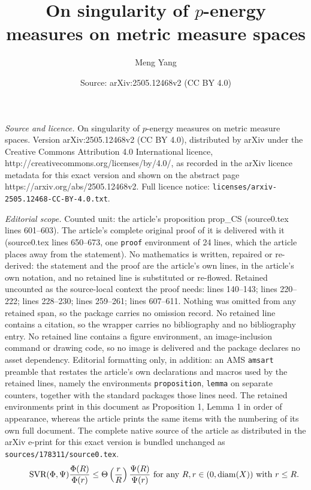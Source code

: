 \documentclass[10pt,a4paper]{amsart}
\title{{On singularity of $p$-energy measures on metric measure spaces}}
\author{Meng Yang}
\date{Source: arXiv:2505.12468v2 (CC BY 4.0)}
\begin{document}
\maketitle

\noindent\emph{Source and licence.} {On singularity of $p$-energy measures on metric measure spaces}. Version arXiv:2505.12468v2 (CC BY 4.0), distributed by arXiv under the Creative Commons Attribution 4.0 International licence, http://creativecommons.org/licenses/by/4.0/, as recorded in the arXiv licence metadata for this exact version and shown on the abstract page https://arxiv.org/abs/2505.12468v2. Full licence notice: \texttt{licenses/arxiv-2505.12468-CC-BY-4.0.txt}.\par\smallskip

\noindent\textit{Editorial scope.} Counted unit: the article's proposition prop\_CS (source0.tex lines 601--603). The article's complete original proof of it is delivered with it (source0.tex lines 650--673, one \texttt{proof} environment of 24 lines, which the article places away from the statement). No mathematics is written, repaired or re-derived: the statement and the proof are the article's own lines, in the article's own notation, and no retained line is substituted or re-flowed.  Retained uncounted as the source-local context the proof needs: lines 140--143; lines 220--222; lines 228--230; lines 259--261; lines 607--611.  Nothing was omitted from any retained span, so the package carries no omission record.  No retained line contains a citation, so the wrapper carries no bibliography and no bibliography entry.  No retained line contains a figure environment, an image-inclusion command or drawing code, so no image is delivered and the package declares no asset dependency.  Editorial formatting only, in addition: an AMS \texttt{amsart} preamble that restates the article's own declarations and macros used by the retained lines, namely the environments \texttt{proposition}, \texttt{lemma} on separate counters, together with the standard packages those lines need.  The retained environments print in this document as Proposition 1, Lemma 1 in order of appearance, whereas the article prints the same items with the numbering of its own full document.  The complete native source of the article as distributed in the arXiv e-print for this exact version is bundled unchanged as \texttt{sources/178311/source0.tex}.
\begin{equation*}\label{eq_SVR}\tag*{$\text{SVR}(\Phi,\Psi)$}
\frac{\Phi(R)}{\Phi(r)}\le\Theta\left(\frac{r}{R}\right)\frac{\Psi(R)}{\Psi(r)}
\text{ for any }R,r\in(0,\mathrm{diam}(X))\text{ with }r\le R.
\end{equation*}
\end{document}
